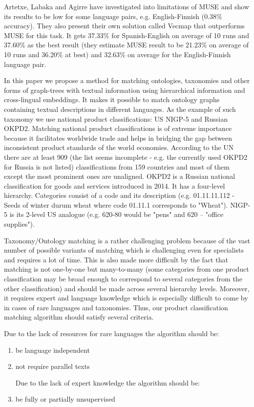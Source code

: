 \documentclass[11pt,a4paper]{article}
\begin{document}
Artetxe, Labaka and Agirre have investigated into limitations of MUSE and show its results to be low for some language pairs, e.g. English-Finnish (0.38\% accuracy). They also present their own solution called Vecmap \cite{vecmap} that outperforms MUSE for this task. It gets 37.33\% for Spanish-English on average of 10 runs and 37.60\% as the best result (they estimate MUSE result to be 21.23\% on average of 10 runs and 36.20\% at best) and 32.63\% on average for the English-Finnish language pair.

In this paper we propose a method for matching ontologies, taxonomies and other forms of graph-trees with textual information using hierarchical information and cross-lingual embeddings. It makes it possible to match ontology graphs containing textual descriptions in different languages. As the example of such taxonomy we use national product classifications: US NIGP-5 and Russian OKPD2. Matching national product classifications is of extreme importance because it facilitates worldwide trade and helps in bridging the gap between inconsistent product standards of the world economies. According to the UN \cite{unsd} there are at least 909 (the list seems incomplete - e.g. the currently used OKPD2 for Russia is not listed) classifications from 159 countries and most of them except the most prominent ones are unaligned. OKPD2 is a Russian national classification for goods and services introduced in 2014. It has a four-level hierarchy. Categories consist of a code and its description (e.g. 01.11.11.112 - Seeds of winter durum wheat where code 01.11.1 corresponds to "Wheat"). NIGP-5 is its 2-level US analogue (e.g. 620-80 would be "pens" and 620 -- "office supplies").

Taxonomy/Ontology matching is a rather challenging problem because of the vast number of possible variants of matching which is challenging even for specialists and requires a lot of time. This is also made more difficult by the fact that matching is not one-by-one but many-to-many (some categories from one product classification may be broad enough to correspond to several categories from the other classification) and should be made across several hierarchy levels. Moreover, it requires expert and language knowledge which is especially difficult to come by in cases of rare languages and taxonomies. Thus, our product classification matching algorithm should satisfy several criteria.

Due to the lack of resources for rare languages	the algorithm should be:
\begin{enumerate}
	
	\item be language independent
	
	\item not require parallel texts
	
	
	Due to the lack of expert knowledge the algorithm should be:
	
	\item be fully or partially unsupervised
\end{enumerate}
\end{document}
